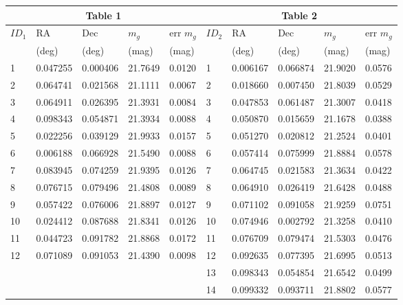 \documentclass[10pt]{article}
\begin{document}
\begin{center}
\begin{tabular}{|l|l|l|l|l|l|l|l|l|l|}
\hline
\multicolumn{5}{|c|}{Table 1} & \multicolumn{5}{|c|}{Table 2} \\
\hline
$I D_{1}$ & RA & Dec & $m_{g}$ & err $m_{g}$ & $I D_{2}$ & RA & Dec & $m_{g}$ & err $m_{g}$ \\
\hline
 & (deg) & (deg) & (mag) & (mag) &  & (deg) & (deg) & (mag) & (mag) \\
\hline
1 & 0.047255 & 0.000406 & 21.7649 & 0.0120 & 1 & 0.006167 & 0.066874 & 21.9020 & 0.0576 \\
\hline
2 & 0.064741 & 0.021568 & 21.1111 & 0.0067 & 2 & 0.018660 & 0.007450 & 21.8039 & 0.0529 \\
\hline
3 & 0.064911 & 0.026395 & 21.3931 & 0.0084 & 3 & 0.047853 & 0.061487 & 21.3007 & 0.0418 \\
\hline
4 & 0.098343 & 0.054871 & 21.3934 & 0.0088 & 4 & 0.050870 & 0.015659 & 21.1678 & 0.0388 \\
\hline
5 & 0.022256 & 0.039129 & 21.9933 & 0.0157 & 5 & 0.051270 & 0.020812 & 21.2524 & 0.0401 \\
\hline
6 & 0.006188 & 0.066928 & 21.5490 & 0.0088 & 6 & 0.057414 & 0.075999 & 21.8884 & 0.0578 \\
\hline
7 & 0.083945 & 0.074259 & 21.9395 & 0.0126 & 7 & 0.064745 & 0.021583 & 21.3634 & 0.0422 \\
\hline
8 & 0.076715 & 0.079496 & 21.4808 & 0.0089 & 8 & 0.064910 & 0.026419 & 21.6428 & 0.0488 \\
\hline
9 & 0.057422 & 0.076006 & 21.8897 & 0.0127 & 9 & 0.071102 & 0.091058 & 21.9259 & 0.0751 \\
\hline
10 & 0.024412 & 0.087688 & 21.8341 & 0.0126 & 10 & 0.074946 & 0.002792 & 21.3258 & 0.0410 \\
\hline
11 & 0.044723 & 0.091782 & 21.8868 & 0.0172 & 11 & 0.076709 & 0.079474 & 21.5303 & 0.0476 \\
\hline
12 & 0.071089 & 0.091053 & 21.4390 & 0.0098 & 12 & 0.092635 & 0.077395 & 21.6995 & 0.0513 \\
\hline
 &  &  &  &  & 13 & 0.098343 & 0.054854 & 21.6542 & 0.0499 \\
\hline
 &  &  &  &  & 14 & 0.099332 & 0.093711 & 21.8802 & 0.0577 \\
\hline
\end{tabular}
\end{center}
\end{document}
